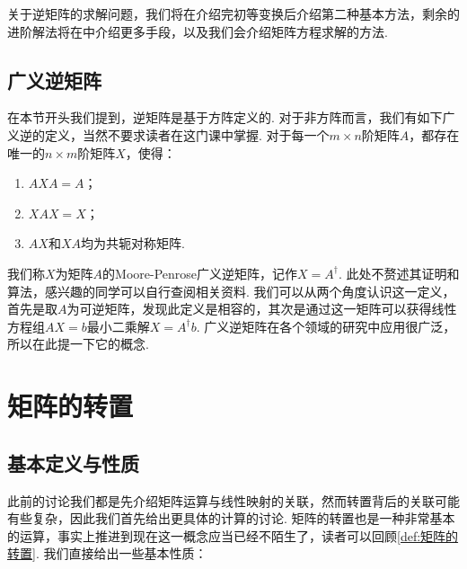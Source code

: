关于逆矩阵的求解问题，我们将在介绍完初等变换后介绍第二种基本方法，剩余的进阶解法将在中介绍更多手段，以及我们会介绍矩阵方程求解的方法.

\subsection{广义逆矩阵}

在本节开头我们提到，逆矩阵是基于方阵定义的. 对于非方阵而言，我们有如下广义逆的定义，当然不要求读者在这门课中掌握. 对于每一个$m \times n$阶矩阵$A$，都存在唯一的$n \times m$阶矩阵$X$，使得：
\begin{enumerate}
    \item $AXA=A$；

    \item $XAX=X$；

    \item $AX$和$XA$均为共轭对称矩阵.
\end{enumerate}
我们称$X$为矩阵$A$的Moore-Penrose广义逆矩阵，记作$X=A^\dagger$. 此处不赘述其证明和算法，感兴趣的同学可以自行查阅相关资料. 我们可以从两个角度认识这一定义，首先是取$A$为可逆矩阵，发现此定义是相容的，其次是通过这一矩阵可以获得线性方程组$AX=b$最小二乘解$X=A^\dagger b$. 广义逆矩阵在各个领域的研究中应用很广泛，所以在此提一下它的概念.

\section{矩阵的转置}
\subsection{基本定义与性质}

此前的讨论我们都是先介绍矩阵运算与线性映射的关联，然而转置背后的关联可能有些复杂，因此我们首先给出更具体的计算的讨论. 矩阵的转置也是一种非常基本的运算，事实上推进到现在这一概念应当已经不陌生了，读者可以回顾\autoref{def:矩阵的转置}. 我们直接给出一些基本性质：

